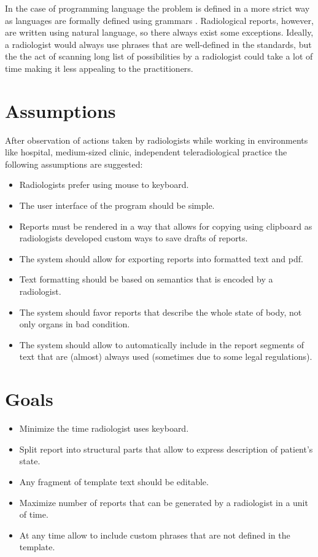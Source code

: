 \documentclass[12pt, twoside, openany]{report}
\theoremstyle{definition}
\begin{document}
In the case of programming language the problem is defined in a more strict way as languages are formally defined using grammars \cite{csharp-spec}. Radiological reports, however, are written using  natural language, so there always exist some exceptions. Ideally, a radiologist would always use phrases that are well-defined in the standards, but the the act of scanning long list of possibilities by a radiologist could take a lot of time making it less appealing to the practitioners.


\section{Assumptions}
After observation of actions taken by radiologists while working in environments like hospital, medium-sized clinic, independent teleradiological practice the following assumptions are suggested:
\begin{itemize}
	\item Radiologists prefer using mouse to keyboard.
	\item The user interface of the program should be simple.
	\item Reports must be rendered in a way that allows for copying using clipboard as radiologists developed custom ways to save drafts of reports.
	\item The system should allow for exporting reports into formatted text and pdf.
	\item Text formatting should be based on semantics that is encoded by a radiologist.
	\item The system should favor reports that describe the whole state of body, not only organs in bad condition.
	\item The system should allow to automatically include in the report segments of text that are (almost) always used (sometimes due to some legal regulations).
	
\end{itemize}
\section{Goals}
\begin{itemize}
	\item Minimize the time radiologist uses keyboard.
	\item Split report into structural parts that allow to express description of patient's state.
	\item Any fragment of template text should be editable. 
	\item Maximize number of reports that can be generated by a radiologist in a unit of time.
	\item At any time allow to include custom phrases that are not defined in the template.
\end{itemize}
\end{document}
